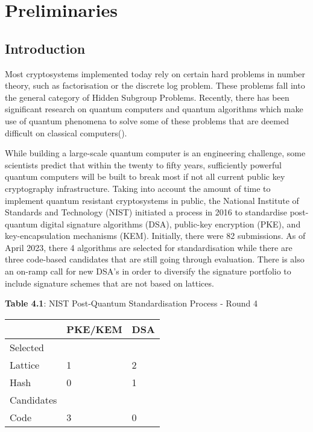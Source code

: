 \chapter{Preliminaries}


\section{Introduction}
Most cryptosystems implemented today rely on certain hard problems in number theory, such as factorisation or the discrete log problem. These problems fall into the general category of Hidden Subgroup Problems. Recently, there has been significant research on quantum computers and quantum algorithms which make use of quantum phenomena to solve some of these problems that are deemed difficult on classical computers(\cite{Shor,Jozsa}). 

While building a large-scale quantum computer is an engineering challenge, some scientists predict that within the twenty to fifty years, sufficiently powerful quantum computers will be built to break most if not all current public key cryptography infrastructure. Taking into account the amount of time to implement quantum resistant cryptosystems in public, the National Institute of Standards and Technology (NIST) initiated a process in 2016 to standardise post-quantum digital signature algorithms (DSA), public-key encryption (PKE), and key-encapsulation mechanisms (KEM). Initially, there were 82 submissions. As of April 2023, there 4 algorithms are selected for standardisation while there are three code-based candidates that are still going through evaluation. There is also an on-ramp call for new DSA's in order to diversify the signature portfolio to include signature schemes that are not based on lattices.


\begin{center}
\textbf{Table 4.1}: NIST Post-Quantum Standardisation Process - Round 4
\end{center}
\begin{table}[h]
\centering
\begin{tabular}{lll}
\hline
 & PKE/KEM & DSA \\ \hline
Selected &  &  \\ \hline
Lattice & 1 & 2 \\
Hash & 0 & 1 \\ \hline
Candidates &  &  \\ \hline
Code & 3 & 0 \\ \hline
\end{tabular}

\end{table}

